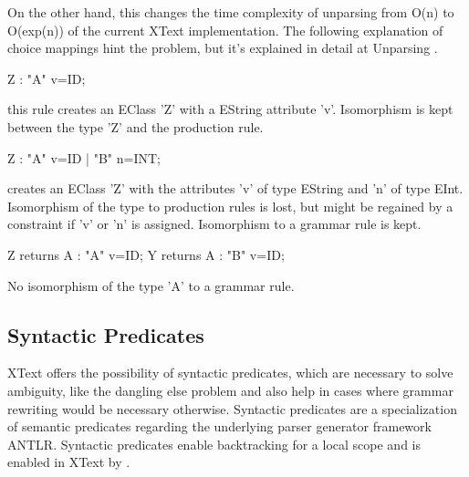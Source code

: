 On the other hand, this changes the time complexity of unparsing from O(n) to O(exp(n)) of the current XText implementation. The following explanation of choice mappings hint the problem, but it's explained in detail at Unparsing .
\begin{xtxt}
Z 	:  "A" v=ID;
\end{xtxt}
this rule creates an EClass 'Z' with a EString attribute 'v'. Isomorphism is kept between the type 'Z' and the production rule.
\begin{xtxt}
Z 	:  "A" v=ID  
	|  "B" n=INT;
	\end{xtxt}
creates an EClass 'Z' with the attributes 'v' of type EString and 'n' of type EInt.  Isomorphism of the type to production rules is lost, but might be regained by a constraint if 'v' or 'n' is assigned. Isomorphism to a grammar rule is kept.
\begin{xtxt}
Z returns A : "A" v=ID;
Y returns A : "B" v=ID;
\end{xtxt}
No isomorphism of the type 'A' to a grammar rule.

\subsection{Syntactic Predicates}
XText offers the possibility of syntactic predicates, which are necessary to solve ambiguity, like the dangling else problem and also help in cases where grammar rewriting would be necessary otherwise. Syntactic predicates are a specialization of semantic predicates regarding the underlying parser generator framework ANTLR. Syntactic predicates enable backtracking for a local scope and is enabled in XText by \code{=>}.